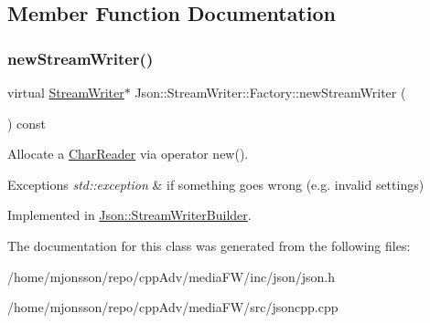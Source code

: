 \subsection{Member Function Documentation}
\mbox{\label{classJson_1_1StreamWriter_1_1Factory_a9d30ec53e8288cd53befccf1009c5f31}} 
\subsubsection{\texorpdfstring{new\+Stream\+Writer()}{newStreamWriter()}}
{\footnotesize\ttfamily virtual \hyperlink{classJson_1_1StreamWriter}{Stream\+Writer}$\ast$ Json\+::\+Stream\+Writer\+::\+Factory\+::new\+Stream\+Writer (\begin{DoxyParamCaption}{ }\end{DoxyParamCaption}) const\hspace{0.3cm}{\ttfamily [pure virtual]}}



Allocate a \hyperlink{classJson_1_1CharReader}{Char\+Reader} via operator new(). 


\begin{DoxyExceptions}{Exceptions}
{\em std\+::exception} & if something goes wrong (e.\+g. invalid settings) \\
\hline
\end{DoxyExceptions}


Implemented in \hyperlink{classJson_1_1StreamWriterBuilder_ab9ee278609f88ae04a7c1a84e1f559e6}{Json\+::\+Stream\+Writer\+Builder}.



The documentation for this class was generated from the following files\+:\begin{DoxyCompactItemize}
\item 
/home/mjonsson/repo/cpp\+Adv/media\+F\+W/inc/json/json.\+h\item 
/home/mjonsson/repo/cpp\+Adv/media\+F\+W/src/jsoncpp.\+cpp\end{DoxyCompactItemize}
